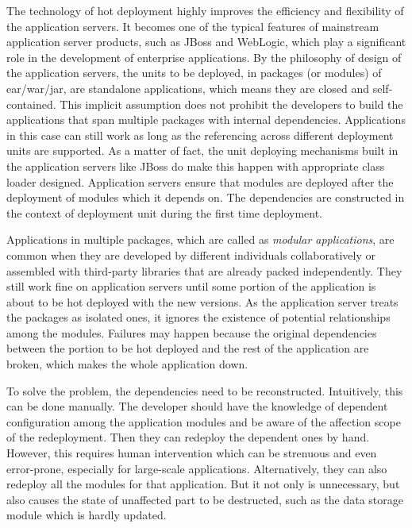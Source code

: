 \documentclass[conference]{IEEEtran}
\begin{document}
The technology of hot deployment highly improves the efficiency and flexibility of the application servers.
It becomes one of the typical features of mainstream application server products, such as JBoss\cite{jboss} and WebLogic\cite{weblogic}, which play a significant role in the development of enterprise applications. By the philosophy of design of the application servers, the units to be deployed, in packages (or modules) of ear/war/jar, are standalone applications, which means they are closed and self-contained. This implicit assumption does not prohibit the developers to build the applications that span multiple packages with internal dependencies. Applications in this case can still work as long as the referencing across different deployment units are supported. As a matter of fact, the unit deploying mechanisms built in the application servers like JBoss do make this happen with appropriate class loader designed. Application servers ensure that modules are deployed after the deployment of modules which it depends on. The dependencies are constructed in the context of deployment unit during the first time deployment.

Applications in multiple packages, which are called as \emph{modular applications}, are common when they are developed by different individuals collaboratively or assembled with third-party libraries that are already packed independently. They still work fine on application servers until some portion of the application is about to be hot deployed  with the new versions. As the application server treats the packages as isolated ones, it ignores the existence of potential relationships among the modules. Failures may happen because the original dependencies between the portion to be hot deployed and the rest of the application are broken, which makes the whole application down.

To solve the problem, the dependencies need to be reconstructed. Intuitively, this can be done manually. The developer should have the knowledge of dependent configuration among the application modules and be aware of the affection scope of the redeployment. Then they can redeploy the dependent ones by hand. However, this requires human intervention which can be strenuous and even error-prone, especially for large-scale applications. Alternatively, they can also redeploy all the modules for that application. But it not only is unnecessary, but also causes the state of unaffected part to be destructed, such as the data storage module which is hardly updated. 
\end{document}
